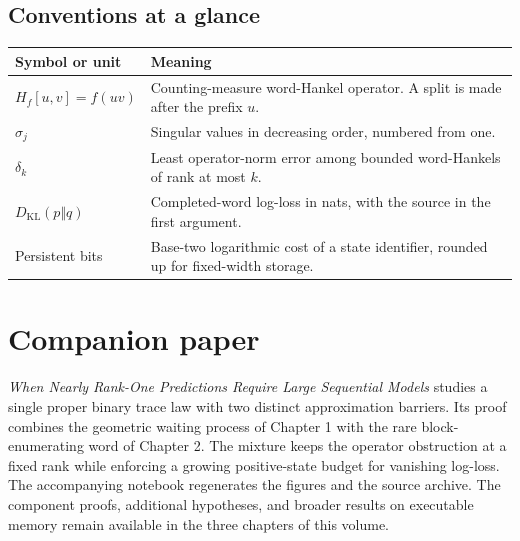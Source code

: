 \documentclass[11pt,oneside,openany]{book}
\theoremstyle{definition}
\theoremstyle{remark}
\begin{document}
\section*{Conventions at a glance}
\begin{tabularx}{\linewidth}{@{}lX@{}}\toprule
Symbol or unit & Meaning\\\midrule
$H_f[u,v]=f(uv)$ & Counting-measure word-Hankel operator. A split is made after the prefix $u$.\\
$\sigma_j$ & Singular values in decreasing order, numbered from one.\\
$\delta_k$ & Least operator-norm error among bounded word-Hankels of rank at most $k$.\\
$D_{\mathrm{KL}}(p\Vert q)$ & Completed-word log-loss in nats, with the source in the first argument.\\
Persistent bits & Base-two logarithmic cost of a state identifier, rounded up for fixed-width storage.\\\bottomrule
\end{tabularx}
\tableofcontents
\mainmatter




\backmatter
\chapter*{Companion paper}
\emph{When Nearly Rank-One Predictions Require Large Sequential Models}
studies a single proper binary trace law with two distinct approximation barriers.
Its proof combines the geometric waiting process of Chapter 1 with the rare
block-enumerating word of Chapter 2. The mixture keeps the operator obstruction
at a fixed rank while enforcing a growing positive-state budget for vanishing
log-loss. The accompanying notebook regenerates the figures and the source archive.
The component proofs, additional hypotheses, and broader results on executable
memory remain available in the three chapters of this volume.

\end{document}
